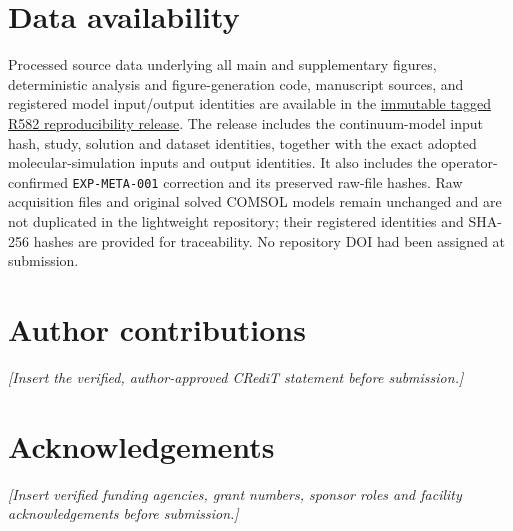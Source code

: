 \documentclass[11pt]{article}
\begin{document}
\section*{Data availability}


Processed source data underlying all main and supplementary figures, deterministic analysis and figure-generation code, manuscript sources, and registered model input/output identities are available in the \href{https://github.com/ccyyyYyzz/ZIFB000/tree/r582-zifb-positive-electrode-reproducibility-v1/R582_PUBLICATION_REPRODUCIBILITY}{immutable tagged R582 reproducibility release}. The release includes the continuum-model input hash, study, solution and dataset identities, together with the exact adopted molecular-simulation inputs and output identities. It also includes the operator-confirmed \texttt{EXP-META-001} correction and its preserved raw-file hashes. Raw acquisition files and original solved COMSOL models remain unchanged and are not duplicated in the lightweight repository; their registered identities and SHA-256 hashes are provided for traceability. No repository DOI had been assigned at submission.

\section*{Author contributions}
\emph{[Insert the verified, author-approved CRediT statement before submission.]}

\section*{Acknowledgements}
\emph{[Insert verified funding agencies, grant numbers, sponsor roles and facility acknowledgements before submission.]}



\end{document}
